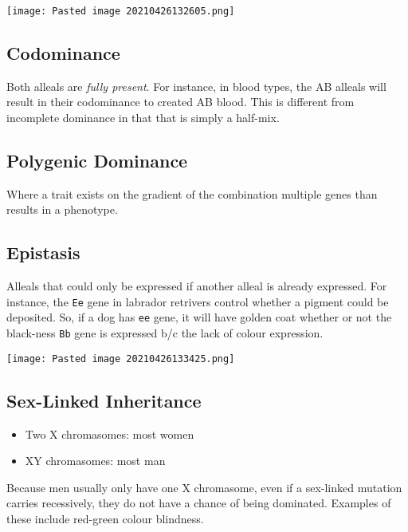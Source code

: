 \documentclass[letterpaper]{article}
\begin{document}
\begin{center}
\texttt{[image: Pasted image 20210426132605.png]}
\end{center}

\subsection{Codominance}
\label{sec:org2049510}
Both alleals are \emph{fully present}. For instance, in blood types, the AB
alleals will result in their codominance to created AB blood. This is
different from incomplete dominance in that that is simply a half-mix.

\subsection{Polygenic Dominance}
\label{sec:org7c9d9b7}
Where a trait exists on the gradient of the combination multiple genes
than results in a phenotype.

\subsection{Epistasis}
\label{sec:orgb4c9a5f}
Alleals that could only be expressed if another alleal is already
expressed. For instance, the \texttt{Ee} gene in labrador retrivers control
whether a pigment could be deposited. So, if a dog has \texttt{ee} gene, it
will have golden coat whether or not the black-ness \texttt{Bb} gene is
expressed b/c the lack of colour expression.

\begin{center}
\texttt{[image: Pasted image 20210426133425.png]}
\end{center}

\subsection{Sex-Linked Inheritance}
\label{sec:org0f41e0f}
\begin{itemize}
\item Two X chromasomes: most women
\item XY chromasomes: most man
\end{itemize}

Because men usually only have one X chromasome, even if a sex-linked
mutation carries recessively, they do not have a chance of being
dominated. Examples of these include red-green colour blindness.
\end{document}
